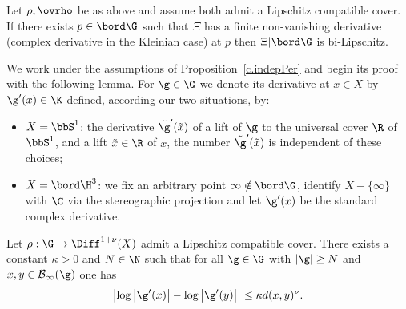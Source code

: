 \begin{prop}\label{c.indepPer}
Let $\rho,\ovrho$ be as above and assume both admit a Lipschitz compatible cover. If there exists $p\in\bord\G$ such that $\Xi$ has a finite non-vanishing derivative (complex derivative in the Kleinian case) at $p$ then $\Xi|\bord\G$ is bi-Lipschitz.
\end{prop}

We work under the assumptions of Proposition~\ref{c.indepPer} and begin its proof with the following lemma. For $\g\in\G$ we denote its derivative at $x\in X$ by $\g'(x)\in\K$ defined, according our two situations, by:
\begin{itemize}
\item $X=\bbS^1$: the derivative $\tilde\g'(\tilde x)$ of a lift of $\g$ to the universal cover $\R$ of $\bbS^1$, and a lift $\tilde x\in\R$ of $x$, the number $\tilde \g'(\tilde x)$ is independent of these choices;
\item $X=\bord\H^3$: we fix an arbitrary point $\infty\notin\bord\G$, identify $X-\{\infty\}$ with $\C$ via the stereographic projection and let $\g'(x)$ be the standard complex derivative.
\end{itemize}


\begin{lemm}\label{controlC}
Let $\rho:\G\to\Diff^{1+\nu}(X)$ admit a Lipschitz compatible cover. There exists a constant $\kappa>0$ and $N\in\N$ such that for all $\g\in\G$ with $|\g|\geq N$ and $x,y\in\cal B_\infty(\g)$ one has
\[
\bigl\lvert\log\left|\g'(x)\right|-\log\left|\g'(y)\right|\bigr|\leq \kappa d(x,y)^\nu.
\]
\end{lemm}



